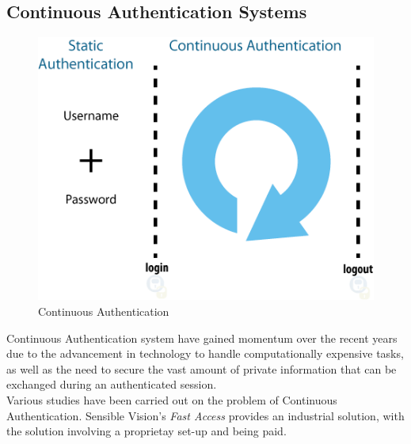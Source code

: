\documentclass[12pt]{article}			%
\begin{document}
\subsection{ Continuous Authentication Systems }
\begin{figure}
	\centering
		\includegraphics[scale=0.6]{img/ca1.png}
	\caption{Continuous Authentication}
\end{figure}
Continuous Authentication system have gained momentum over the recent years due to the advancement in technology to handle computationally expensive tasks, as well as the need to secure the vast amount of private information that can be exchanged during an authenticated session.\\
Various studies\cite{mon00,turk03,sim07,azz08,azz082,kang06,car03} have been carried out on the problem of Continuous Authentication.
Sensible Vision's \emph{Fast Access} provides an industrial solution, with the solution involving a proprietay set-up and being paid.
\end{document}
